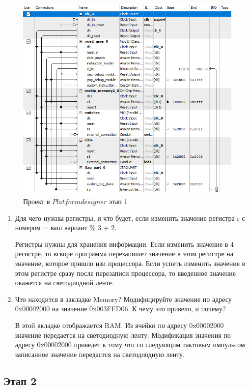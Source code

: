 \documentclass[a4paper,14pt]{article}
\begin{document}
	{\small {}}
	
	\begin{figure}[h]
		\centering
		\includegraphics[width=0.9\linewidth]{images/scheme}
		\caption{Проект в $Platform designer$ этап 1}
		\label{fig:scheme}
	\end{figure}
	
	\begin{enumerate}
		\item Для чего нужны регистры, и что будет, если изменить значение регистра r с номером = ваш вариант \% 3 + 2.
		
		Регистры нужны для хранения информации.
		Если изменить значение в 4 регистре, то вскоре программа перезапишет значение в этом регистре на значение, которое пришло изи процессора.
		Если успеть изменить значение в этом регистре сразу после перезаписи процессора, то введенное значение окажется на светодиодной ленте.
		
		\item Что находится в закладке Memory? Модифицируйте значение по адресу 0x00002000 на значение 0x003FFD06. К чему это привело, и почему?
		
		В этой вкладке отображается RAM.
		Из ячейки по адресу 0x00002000 значение передается на светодиодную ленту.
		Модификация значения по адресу 0x00002000 приведет к тому что со следующим тактовым импульсом записанное значение передастся на светодиодную ленту.
	\end{enumerate}

	\subsection{Этап 2}
\end{document}
